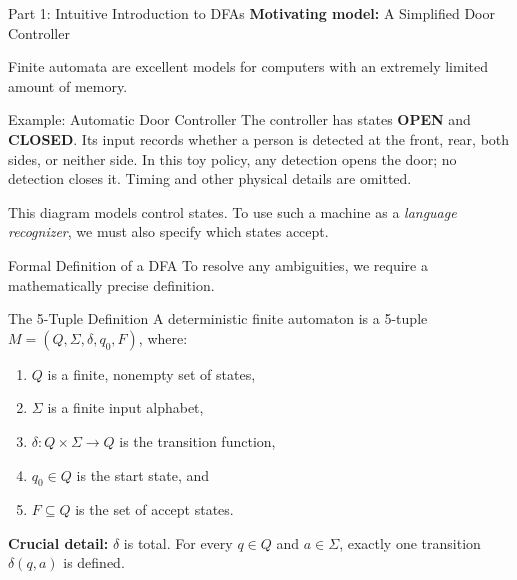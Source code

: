 \documentclass[10pt]{beamer}
\begin{document}
\begin{frame}{Part 1: Intuitive Introduction to DFAs}
  \small
  \textbf{Motivating model:} A Simplified Door Controller
  \vspace{0.2cm}
  
  Finite automata are excellent models for computers with an extremely limited amount of memory.
  \pause
  \begin{block}{Example: Automatic Door Controller}
    The controller has states \textbf{OPEN} and \textbf{CLOSED}. Its input
    records whether a person is detected at the front, rear, both sides, or
    neither side. In this toy policy, any detection opens the door;
    no detection closes it. Timing and other physical details are omitted.
  \end{block}
  \pause
  
  \begin{center}
  \end{center}
  This diagram models control states. To use such a machine as a
  \emph{language recognizer}, we must also specify which states accept.
\end{frame}

\begin{frame}{Formal Definition of a DFA}
  \small
  To resolve any ambiguities, we require a mathematically precise definition.
  \pause
  \begin{block}{The 5-Tuple Definition}
    A deterministic finite automaton is a 5-tuple
    $M=(Q,\Sigma,\delta,q_0,F)$, where:
    \begin{enumerate}
        \item $Q$ is a finite, nonempty set of states,
        \item $\Sigma$ is a finite input alphabet,
        \item $\delta: Q \times \Sigma \rightarrow Q$ is the transition function,
        \item $q_0 \in Q$ is the start state, and
        \item $F \subseteq Q$ is the set of accept states.
    \end{enumerate}
  \end{block}
  \pause
  \vspace{0.2cm}
  \textbf{Crucial detail:} $\delta$ is total. For every $q\in Q$ and
  $a\in\Sigma$, exactly one transition $\delta(q,a)$ is defined.
\end{frame}
\end{document}
